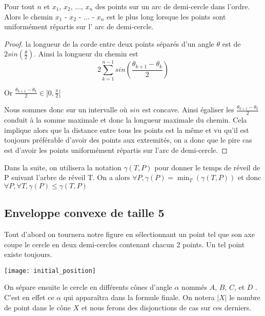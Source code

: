 \begin{lemma}\label{worstchord}
Pour tout $n$ et $x_1$, $x_2$, ..., $x_n$ des points sur un arc de demi-cercle dans l'ordre. Alors le chemin $x_1$ - $x_2$ - ... - $x_n$ est le plus long lorsque les points sont uniformément répartis sur l' arc de demi-cercle.
\end{lemma}
\begin{proof}
la longueur de la corde entre deux points séparés d'un angle $\theta$ est de $2sin\left(\frac{\theta}{2}\right)$. Ainsi la longueur du chemin est 
$$2\sum_{k=1}^{n-1} sin\left(\frac{\theta_{k+1} - \theta_k}{2}\right)$$

Or $\frac{\theta_{k+1} - \theta_k}{2} \in ]0, \frac{\pi}{2}[$

Nous sommes donc sur un intervalle où $sin$ est concave. Ainsi égaliser les $\frac{\theta_{k+1} - \theta_k}{2}$ conduit à la somme maximale et donc la longueur maximale du chemin. 
Cela implique alors que la distance entre tous les points est la même et vu qu'il est toujours préférable d'avoir des points aux extremités, on a donc que le pire cas est d'avoir les points uniformément répartis sur l'arc de demi-cercle.

\end{proof}

Dans la suite, on utilisera la notation $\gamma(T, P)$ pour donner le temps de réveil de P suivant l'arbre de réveil T.
On a alors $\forall P, \gamma(P) = \min_T(\gamma(T,P))$
et donc $\forall P, \forall T, \gamma(P) \leq \gamma(T, P)$


\subsection{Enveloppe convexe de taille 5}

 Tout d'abord on tournera notre figure en sélectionnant un point tel que son axe coupe le cercle en deux demi-cercles contenant chacun 2 points. Un tel point existe toujours.

\texttt{[image: initial\_position]}

On sépare ensuite le cercle en différents cônes d'angle $\alpha$ nommés $A$,
$B$, $C$, et $D$ . C'est en effet ce $\alpha$ qui apparaîtra dans la formule finale. On notera $|X|$ le nombre de point dans le cône $X$ et nous ferons des disjonctions de cas sur ces derniers.

